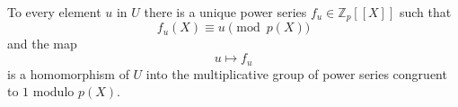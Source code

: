 To every element $u$ in $U$ there is a unique power series $f_u \in \mathbb{Z}_p[[X]]$ such that
$$f_u(X) \equiv u \pmod{p(X)}$$
and the map
$$u \mapsto f_u$$
is a homomorphism of $U$ into the multiplicative group of power series congruent to $1$ modulo $p(X)$.
